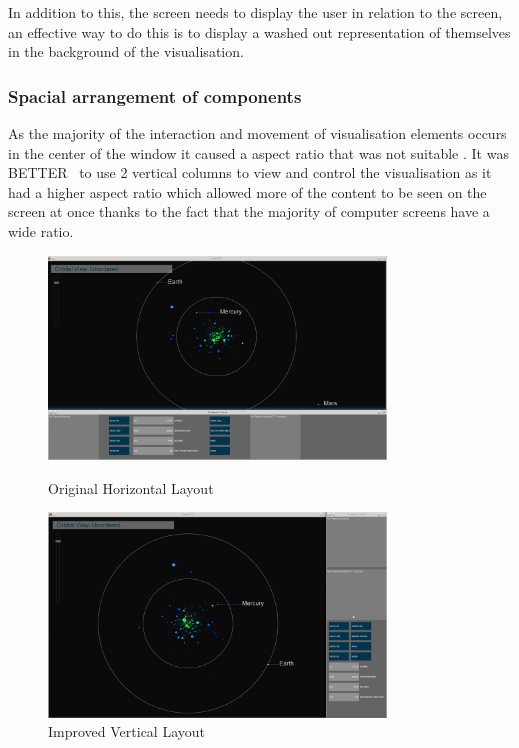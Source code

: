 In addition to this, the screen needs to display the user in relation to the
screen, an effective way to do this is to display a washed out representation of
themselves in the background of the visualisation.


\subsubsection{Spacial arrangement of components}
As the majority of the interaction and movement of visualisation elements occurs
in the center of the window it caused a aspect ratio that was not suitable . It
was BETTER~ to use 2 vertical columns to view and control the visualisation as
it had a higher aspect ratio which allowed more of the content to be seen on the
screen at once thanks to the fact that the majority of computer screens have a
wide ratio.

\begin{figure}[H]
  \centering
      \includegraphics[width=0.8\textwidth]{images/layout_horizontal.jpg}
  \caption{Original Horizontal Layout}  
        \includegraphics[width=0.8\textwidth]{images/layout_vertical.jpg}
  \caption{Improved Vertical Layout}
\end{figure}


